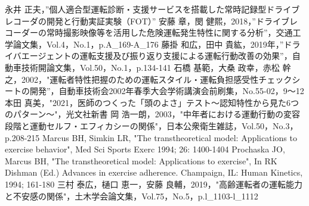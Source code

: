 \documentclass[twocolumn,a4j]{jarticle}
\begin{document}
\begin{thebibliography}{9}
 永井 正夫，”個人適合型運転診断・支援サービスを搭載した常時記録型ドライブレコーダの開発と行動実証実験（FOT）”
 安藤 章，閔 健熙，2018，”ドライブレコーダーの常時撮影映像等を活用した危険運転発生特性に関する分析”，交通工学論文集，Vol.4，No.1，p.A\_169-A\_176
 藤掛 和広，田中 貴紘，2019年，”ドライバエージェントの運転支援及び振り返り支援による運転行動改善の効果”，自動車技術開論文集，Vol.50，No.1，p.134-141
 石橋 基範，大桑 政幸，赤松 幹之，2002，"運転者特性把握のための運転スタイル・運転負担感受性チェックシートの開発''，自動車技術会2002年春季大会学術講演会前刷集，No.55-02，9～12
 本田 真美，"2021，医師のつくった「頭のよさ」テスト～認知特性から見た6つのパターン～"，光文社新書
 岡 浩一朗，2003，"中年者における運動行動の変容段階と運動セルフ・エフィカシーの関係"，日本公衆衛生雑誌，Vol.50，No.3，p.208-215
Marcus BH, Simkin LR, "The transtheoretical model: Applications to exercise behavior", Med Sci Sports Exerc 1994; 26: 1400-1404
Prochaska JO, Marcus BH, "The transtheoretical model: Applications to exercise", In RK Dishman (Ed.) Advances in exercise adherence. Champaign, IL: Human Kinetics, 1994; 161-180
 三村 泰広，樋口 恵一，安藤 良輔，2019，"高齢運転者の運転能力と不安感の関係"，土木学会論文集，Vol.75，No.5，p.l\_1103-l\_1112
\end{thebibliography}
%
\thispagestyle{fancy}
\renewcommand{\headrulewidth}{0.0pt}
\end{document}
